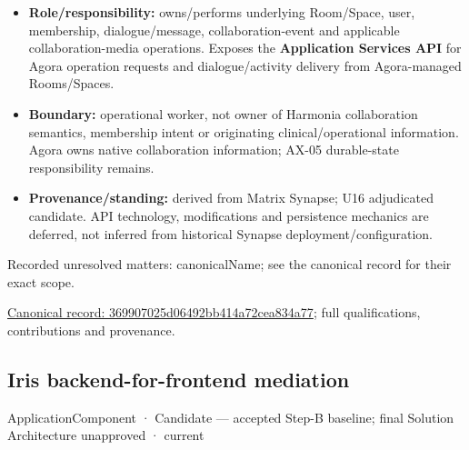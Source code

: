 \begin{itemize}


\item \textbf{Role/responsibility:} owns/performs underlying Room/Space, user, membership,
  dialogue/message, collaboration-event and applicable collaboration-media
  operations. Exposes the \textbf{Application Services API} for Agora operation requests
  and dialogue/activity delivery from Agora-managed Rooms/Spaces.

\item \textbf{Boundary:} operational worker, not owner of Harmonia collaboration semantics,
  membership intent or originating clinical/operational information. Agora owns
  native collaboration information; AX-05 durable-state responsibility remains.

\item \textbf{Provenance/standing:} derived from Matrix Synapse; U16 adjudicated candidate.
  API technology, modifications and persistence mechanics are deferred, not
  inferred from historical Synapse deployment/configuration.

\end{itemize}

{\small Recorded unresolved matters: canonicalName; see the canonical record for their exact scope.}\par
{\footnotesize \href{../../../../continuum/application/application-component/369907025d06492bb414a72cea834a77.md}{Canonical record: 369907025d06492bb414a72cea834a77}; full qualifications, contributions and provenance.}\par
\subsection{Iris backend-for-frontend mediation}

\label{element:37b82d161c5640298e951acc361b338a}
{\small ApplicationComponent · Candidate — accepted Step-B baseline; final Solution Architecture unapproved · current}\par

